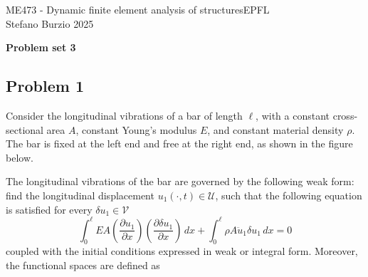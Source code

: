 \documentclass[12pt]{article}
\begin{document}
\noindent ME473 - Dynamic finite element analysis of structures\hfill EPFL\\
Stefano Burzio \hfill 2025\\
\vspace{0.3cm}

\hspace*{\fill}\textbf{\Large Problem set 3}\hspace*{\fill}

\hrulefill


\subsection*{Problem 1}
Consider the longitudinal vibrations of a bar of length \( \ell \), with a constant cross-sectional area \( A \), constant Young's modulus \( E \), and constant material density \( \rho \). The bar is fixed at the left end and free at the right end, as shown in the figure below.
\begin{center}
\end{center}
The longitudinal vibrations of the bar are governed by the following weak form: find the longitudinal displacement $u_1(\cdot,t) \in \mathcal U$, such that the following equation is satisfied for every $\delta u_1 \in \mathcal V$
\begin{equation*}
    \label{wf}
    \int_0^{\ell} E A\left(\frac{\partial u_1}{\partial x}\right)\left(\frac{\partial \delta u_1}{\partial x}\right)\, dx+
    \int_0^{\ell} \rho A \ddot{u}_1 \delta u_1\, dx=0
\end{equation*}
coupled with the initial conditions expressed in weak or integral form. Moreover, the functional spaces are defined as
\end{document}
